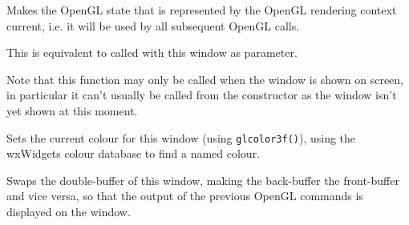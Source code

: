 
Makes the OpenGL state that is represented by the OpenGL rendering context
 current, i.e. it will be used by all subsequent OpenGL calls.

This is equivalent to  
called with this window as parameter.

Note that this function may only be called when the window is shown on screen,
in particular it can't usually be called from the constructor as the window
isn't yet shown at this moment.


\label{wxglcanvassetcolour}


Sets the current colour for this window (using \texttt{glcolor3f()}), using the
wxWidgets colour database to find a named colour.


\label{wxglcanvasswapbuffers}


Swaps the double-buffer of this window, making the back-buffer the front-buffer and vice versa,
so that the output of the previous OpenGL commands is displayed on the window.

